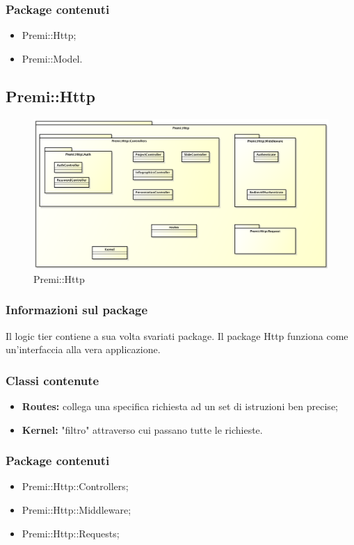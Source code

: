 	\subsubsection*{Package contenuti}
	\begin{itemize}
		\item Premi::Http;
		\item Premi::Model.
	\end{itemize}

\newpage
\subsection{Premi::Http}
		\begin{figure}[h]
			\centering
			\includegraphics[width=0.9\linewidth]{img/premi_http}
			\caption[Premi::Http]{Premi::Http}
			\label{fig:premi_http}
		\end{figure}

	\subsubsection*{Informazioni sul package}
	 Il logic tier contiene a sua volta svariati package. Il package Http funziona come un'interfaccia alla vera applicazione.
	 \subsubsection*{Classi contenute}
	 \begin{itemize}
	 	\item \textbf{Routes: }collega una specifica richiesta ad un set di istruzioni ben precise;
	 	\item \textbf{Kernel: }"filtro" attraverso cui passano tutte le richieste.
	 \end{itemize}
	 \subsubsection*{Package contenuti}
		 \begin{itemize}
		 	\item Premi::Http::Controllers;
		 	\item Premi::Http::Middleware;
		 	\item Premi::Http::Requests;
		 \end{itemize}

